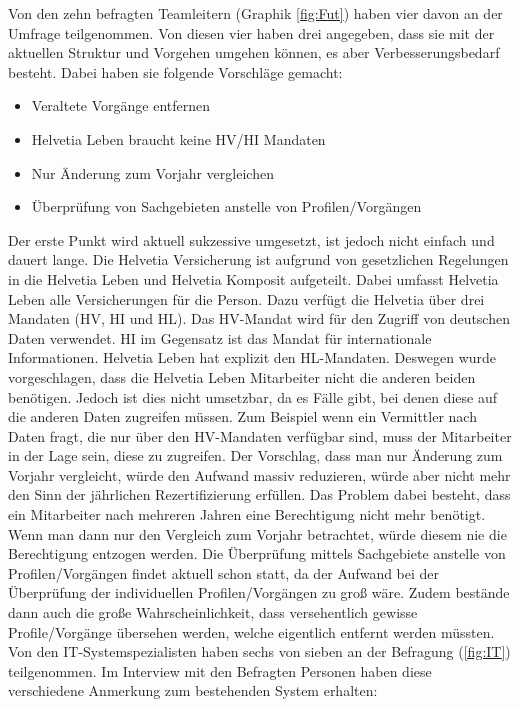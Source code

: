 \newpage
Von den zehn befragten Teamleitern (Graphik \ref{fig:Fut}) haben vier davon an der Umfrage teilgenommen.
Von diesen vier haben drei angegeben, dass sie mit der aktuellen Struktur und Vorgehen umgehen können, es aber Verbesserungsbedarf besteht.
Dabei haben sie folgende Vorschläge gemacht:

\begin{itemize}
	\item Veraltete Vorgänge entfernen
	\item Helvetia Leben braucht keine HV/HI Mandaten
	\item Nur Änderung zum Vorjahr vergleichen
	\item Überprüfung von Sachgebieten anstelle von Profilen/Vorgängen
\end{itemize}

Der erste Punkt wird aktuell sukzessive umgesetzt, ist jedoch nicht einfach und dauert lange.
Die Helvetia Versicherung ist aufgrund von gesetzlichen Regelungen in die Helvetia Leben und Helvetia Komposit aufgeteilt.
Dabei umfasst Helvetia Leben alle Versicherungen für die Person.
Dazu verfügt die Helvetia über drei Mandaten (HV, HI und HL).
Das HV-Mandat wird für den Zugriff von deutschen Daten verwendet.
HI im Gegensatz ist das Mandat für internationale Informationen.
Helvetia Leben hat explizit den HL-Mandaten.
Deswegen wurde vorgeschlagen, dass die Helvetia Leben Mitarbeiter nicht die anderen beiden benötigen.
Jedoch ist dies nicht umsetzbar, da es Fälle gibt, bei denen diese auf die anderen Daten zugreifen müssen.
Zum Beispiel wenn ein Vermittler nach Daten fragt, die nur über den HV-Mandaten verfügbar sind, muss der Mitarbeiter in der Lage sein, diese zu zugreifen.
\newline
Der Vorschlag, dass man nur Änderung zum Vorjahr vergleicht, würde den Aufwand massiv reduzieren, würde aber nicht mehr den Sinn der jährlichen Rezertifizierung erfüllen.
Das Problem dabei besteht, dass ein Mitarbeiter nach mehreren Jahren eine Berechtigung nicht mehr benötigt.
Wenn man dann nur den Vergleich zum Vorjahr betrachtet, würde diesem nie die Berechtigung entzogen werden.
\newline
Die Überprüfung mittels Sachgebiete anstelle von Profilen/Vorgängen findet aktuell schon statt, da der Aufwand bei der Überprüfung der individuellen Profilen/Vorgängen zu groß wäre.
Zudem bestände dann auch die große Wahrscheinlichkeit, dass versehentlich gewisse Profile/Vorgänge übersehen werden, welche eigentlich entfernt werden müssten.
\newline
\newline
Von den IT-Systemspezialisten haben sechs von sieben an der Befragung (\ref{fig:IT}) teilgenommen.
Im Interview mit den Befragten Personen haben diese verschiedene Anmerkung zum bestehenden System erhalten:

